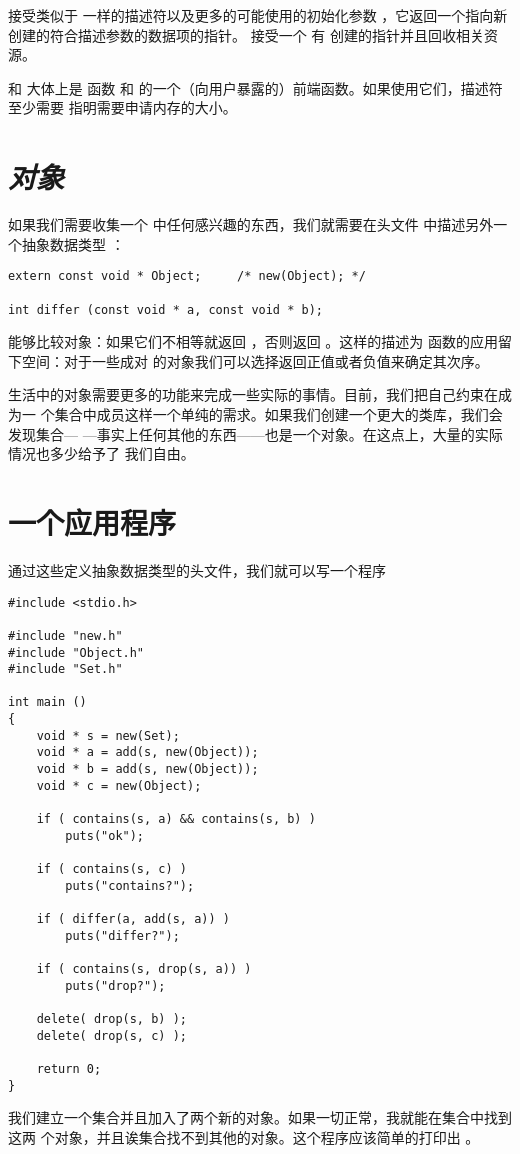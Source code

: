 接受类似于  一样的描述符以及更多的可能使用的初始化参数
，它返回一个指向新创建的符合描述参数的数据项的指针。 接受一个
有  创建的指针并且回收相关资源。

 和  大体上是  函数 
和  的一个（向用户暴露的）前端函数。如果使用它们，描述符至少需要
指明需要申请内存的大小。

\section{\emph{对象}}
\label{sec:object}
如果我们需要收集一个 中任何感兴趣的东西，我们就需要在头文件
 中描述另外一个抽象数据类型 ：
\begin{lstlisting}
extern const void * Object;		/* new(Object); */

int differ (const void * a, const void * b);
\end{lstlisting}
 能够比较对象：如果它们不相等就返回 ，否则返回
。这样的描述为  函数的应用留下空间：对于一些成对
的对象我们可以选择返回正值或者负值来确定其次序。

生活中的对象需要更多的功能来完成一些实际的事情。目前，我们把自己约束在成为一
个集合中成员这样一个单纯的需求。如果我们创建一个更大的类库，我们会发现集合—
—事实上任何其他的东西——也是一个对象。在这点上，大量的实际情况也多少给予了
我们自由。

\section{一个应用程序}
\label{sec:adtApp}
通过这些定义抽象数据类型的头文件，我们就可以写一个程序 
\begin{lstlisting}
#include <stdio.h>

#include "new.h"
#include "Object.h"
#include "Set.h"

int main ()
{
	void * s = new(Set);
	void * a = add(s, new(Object));
	void * b = add(s, new(Object));
	void * c = new(Object);

	if ( contains(s, a) && contains(s, b) )
		puts("ok");

	if ( contains(s, c) )
		puts("contains?");

	if ( differ(a, add(s, a)) )
		puts("differ?");

	if ( contains(s, drop(s, a)) )
		puts("drop?");

	delete( drop(s, b) );
	delete( drop(s, c) );

	return 0;
}
\end{lstlisting}
我们建立一个集合并且加入了两个新的对象。如果一切正常，我就能在集合中找到这两
个对象，并且诶集合找不到其他的对象。这个程序应该简单的打印出 。

